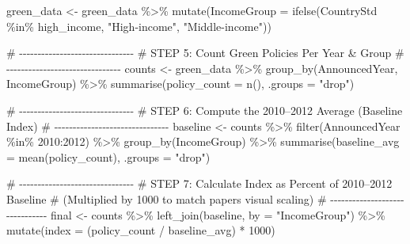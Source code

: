 \documentclass[
  letterpaper,
  DIV=11,
  numbers=noendperiod]{scrartcl}
\newenvironment{Shaded}{\begin{snugshade}}{\end{snugshade}}
\newcommand{\AttributeTok}[1]{\textcolor[rgb]{0.40,0.45,0.13}{#1}}
\newcommand{\CommentTok}[1]{\textcolor[rgb]{0.37,0.37,0.37}{#1}}
\newcommand{\DecValTok}[1]{\textcolor[rgb]{0.68,0.00,0.00}{#1}}
\newcommand{\FunctionTok}[1]{\textcolor[rgb]{0.28,0.35,0.67}{#1}}
\newcommand{\NormalTok}[1]{\textcolor[rgb]{0.00,0.23,0.31}{#1}}
\newcommand{\OtherTok}[1]{\textcolor[rgb]{0.00,0.23,0.31}{#1}}
\newcommand{\SpecialCharTok}[1]{\textcolor[rgb]{0.37,0.37,0.37}{#1}}
\newcommand{\StringTok}[1]{\textcolor[rgb]{0.13,0.47,0.30}{#1}}
\begin{document}
\begin{Shaded}
\begin{Highlighting}[]
\NormalTok{green\_data }\OtherTok{\textless{}{-}}\NormalTok{ green\_data }\SpecialCharTok{\%\textgreater{}\%}
  \FunctionTok{mutate}\NormalTok{(}\AttributeTok{IncomeGroup =} \FunctionTok{ifelse}\NormalTok{(CountryStd }\SpecialCharTok{\%in\%}\NormalTok{ high\_income, }\StringTok{"High{-}income"}\NormalTok{, }\StringTok{"Middle{-}income"}\NormalTok{))}

\CommentTok{\# {-}{-}{-}{-}{-}{-}{-}{-}{-}{-}{-}{-}{-}{-}{-}{-}{-}{-}{-}{-}{-}{-}{-}{-}{-}{-}{-}{-}{-}{-}{-}}
\CommentTok{\# STEP 5: Count Green Policies Per Year \& Group}
\CommentTok{\# {-}{-}{-}{-}{-}{-}{-}{-}{-}{-}{-}{-}{-}{-}{-}{-}{-}{-}{-}{-}{-}{-}{-}{-}{-}{-}{-}{-}{-}{-}{-}}
\NormalTok{counts }\OtherTok{\textless{}{-}}\NormalTok{ green\_data }\SpecialCharTok{\%\textgreater{}\%}
  \FunctionTok{group\_by}\NormalTok{(AnnouncedYear, IncomeGroup) }\SpecialCharTok{\%\textgreater{}\%}
  \FunctionTok{summarise}\NormalTok{(}\AttributeTok{policy\_count =} \FunctionTok{n}\NormalTok{(), }\AttributeTok{.groups =} \StringTok{"drop"}\NormalTok{)}

\CommentTok{\# {-}{-}{-}{-}{-}{-}{-}{-}{-}{-}{-}{-}{-}{-}{-}{-}{-}{-}{-}{-}{-}{-}{-}{-}{-}{-}{-}{-}{-}{-}{-}}
\CommentTok{\# STEP 6: Compute the 2010–2012 Average (Baseline Index)}
\CommentTok{\# {-}{-}{-}{-}{-}{-}{-}{-}{-}{-}{-}{-}{-}{-}{-}{-}{-}{-}{-}{-}{-}{-}{-}{-}{-}{-}{-}{-}{-}{-}{-}}
\NormalTok{baseline }\OtherTok{\textless{}{-}}\NormalTok{ counts }\SpecialCharTok{\%\textgreater{}\%}
  \FunctionTok{filter}\NormalTok{(AnnouncedYear }\SpecialCharTok{\%in\%} \DecValTok{2010}\SpecialCharTok{:}\DecValTok{2012}\NormalTok{) }\SpecialCharTok{\%\textgreater{}\%}
  \FunctionTok{group\_by}\NormalTok{(IncomeGroup) }\SpecialCharTok{\%\textgreater{}\%}
  \FunctionTok{summarise}\NormalTok{(}\AttributeTok{baseline\_avg =} \FunctionTok{mean}\NormalTok{(policy\_count), }\AttributeTok{.groups =} \StringTok{"drop"}\NormalTok{)}

\CommentTok{\# {-}{-}{-}{-}{-}{-}{-}{-}{-}{-}{-}{-}{-}{-}{-}{-}{-}{-}{-}{-}{-}{-}{-}{-}{-}{-}{-}{-}{-}{-}{-}}
\CommentTok{\# STEP 7: Calculate Index as Percent of 2010–2012 Baseline}
\CommentTok{\#         (Multiplied by 1000 to match paper\textquotesingle{}s visual scaling)}
\CommentTok{\# {-}{-}{-}{-}{-}{-}{-}{-}{-}{-}{-}{-}{-}{-}{-}{-}{-}{-}{-}{-}{-}{-}{-}{-}{-}{-}{-}{-}{-}{-}{-}}
\NormalTok{final }\OtherTok{\textless{}{-}}\NormalTok{ counts }\SpecialCharTok{\%\textgreater{}\%}
  \FunctionTok{left\_join}\NormalTok{(baseline, }\AttributeTok{by =} \StringTok{"IncomeGroup"}\NormalTok{) }\SpecialCharTok{\%\textgreater{}\%}
  \FunctionTok{mutate}\NormalTok{(}\AttributeTok{index =}\NormalTok{ (policy\_count }\SpecialCharTok{/}\NormalTok{ baseline\_avg) }\SpecialCharTok{*} \DecValTok{1000}\NormalTok{)}


\end{Highlighting}
\end{Shaded}
\end{document}
